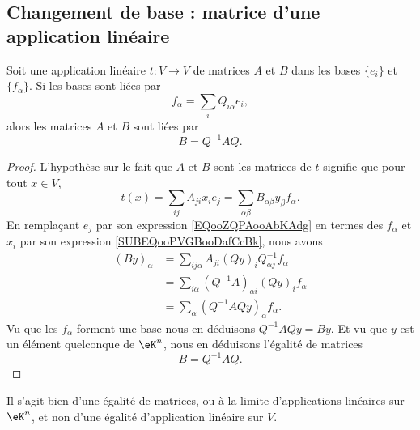 \subsection{Changement de base : matrice d'une application linéaire}

\begin{proposition}     \label{PROPooNZBEooWyCXTw}
    Soit une application linéaire \( t\colon V\to V\) de matrices \( A\) et \( B\) dans les bases \( \{ e_i \}\) et \( \{ f_{\alpha} \}\). Si les bases sont liées par
    \begin{equation}
        f_{\alpha}=\sum_iQ_{i\alpha}e_i,
    \end{equation}
    alors les matrices \( A\) et \( B\) sont liées par
    \begin{equation}
        B=Q^{-1}AQ.
    \end{equation}
\end{proposition}

\begin{proof}
    L'hypothèse sur le fait que \( A\) et \( B\) sont les matrices de \( t\) signifie que pour tout \( x\in V\),
    \begin{equation}
        t(x)=\sum_{ij}A_{ji}x_ie_j=\sum_{\alpha\beta}B_{\alpha\beta}y_{\beta}f_{\alpha}.
    \end{equation}
    En remplaçant \( e_j\) par son expression \eqref{EQooZQPAooAbKAdg} en termes des \( f_{\alpha}\) et \( x_i\) par son expression \eqref{SUBEQooPVGBooDafCcBk}, nous avons
    \begin{subequations}
        \begin{align}
            (By)_{\alpha}&=\sum_{ij\alpha}A_{ji}(Qy)_iQ^{-1}_{\alpha j}f_{\alpha}\\
            &=\sum_{i \alpha}(Q^{-1}A)_{\alpha i}(Qy)_if_{\alpha}\\
            &=\sum_{\alpha}(Q^{-1} AQy)_{\alpha}f_{\alpha}.
        \end{align}
    \end{subequations}
    Vu que les \( f_{\alpha}\) forment une base nous en déduisons \( Q^{-1}AQy=By\). Et vu que \( y\) est un élément quelconque de \( \eK^n\), nous en déduisons l'égalité de matrices
    \begin{equation}        \label{ooWKTYooOJfclT}
        B=Q^{-1}AQ.
    \end{equation}
\end{proof}
Il s'agit bien d'une égalité de matrices, ou à la limite d'applications linéaires sur \( \eK^n\), et non d'une égalité d'application linéaire sur \( V\).

